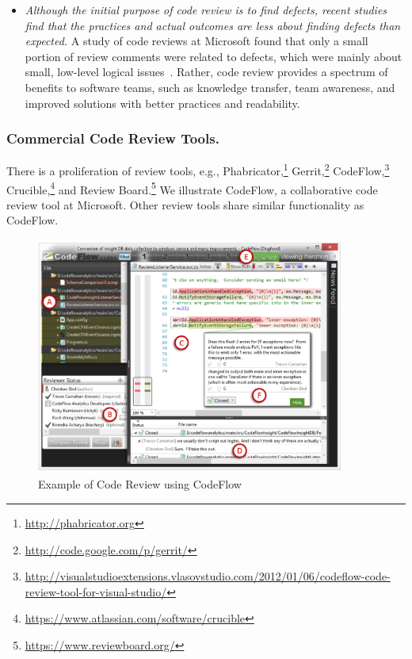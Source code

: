 \begin{itemize}
\item {\it Although the initial purpose of code review is to find defects, recent studies find that the practices and actual outcomes are less about finding defects than expected.} A study of code reviews at Microsoft found that only a small portion of review comments were related to defects, which were mainly about small, low-level logical issues~\cite{bacchelli2013expectations}. Rather, code review provides a spectrum of benefits to software teams, such as knowledge transfer, team awareness, and improved solutions with better practices and readability. 

\end{itemize} 

\subsubsection{Commercial Code Review Tools.} 
\label{sec:reviewtool} 

There is a proliferation of review tools, e.g., Phabricator,\footnote{\url{http://phabricator.org}} Gerrit,\footnote{\url{http://code.google.com/p/gerrit/}} CodeFlow,\footnote{\url{http://visualstudioextensions.vlasovstudio.com/2012/01/06/codeflow-code-review-tool-for-visual-studio/}} Crucible,\footnote{\url{https://www.atlassian.com/software/crucible}} and Review Board.\footnote{\url{https://www.reviewboard.org/}} We illustrate CodeFlow, a collaborative code review tool at Microsoft. Other review tools share similar functionality as CodeFlow.

\begin{figure}[ht]
 \centering
 \includegraphics[width=0.9\textwidth]{images/codeflow-v2.pdf}
 \caption{Example of Code Review using CodeFlow~\cite{bosu2015characteristics}}
 \label{fig:codeflow}
\end{figure}

